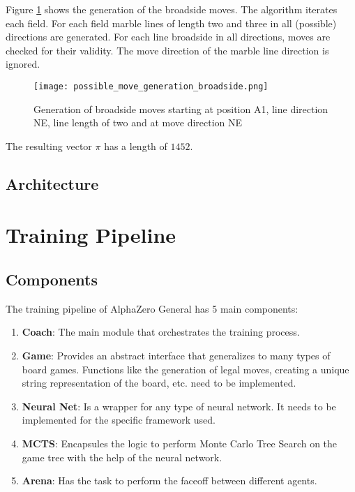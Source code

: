 \begin{enumerate}
          Figure \ref{possible_move_generation_broadside} shows the generation of the broadside moves. The algorithm iterates each field. For each field marble lines of length two and three in all (possible) directions are generated. For each line broadside in all directions, moves are checked for their validity. The move direction of the marble line direction is ignored.

          \begin{figure}
              \centering
              \texttt{[image: possible\_move\_generation\_broadside.png]}
              \caption{Generation of broadside moves starting at position A1, line direction NE, line length of two and at move direction NE}
              \label{possible_move_generation_broadside}
          \end{figure}

          The resulting vector $\pi$ has a length of $1452$.
\end{enumerate}

\subsection{Architecture}
\section{Training Pipeline}
\subsection{Components}
\label{components}

The training pipeline of AlphaZero General has 5 main components:
\begin{enumerate}
    \item \textbf{Coach}: The main module that orchestrates the training process.
    \item \textbf{Game}: Provides an abstract interface that generalizes to many types of board games. Functions like the generation of legal moves, creating a unique string representation of the board, etc. need to be implemented.
    \item \textbf{Neural Net}: Is a wrapper for any type of neural network. It needs to be implemented for the specific framework used.
    \item \textbf{MCTS}: Encapsules the logic to perform Monte Carlo Tree Search on the game tree with the help of the neural network.
    \item \textbf{Arena}: Has the task to perform the faceoff between different agents.
\end{enumerate}

